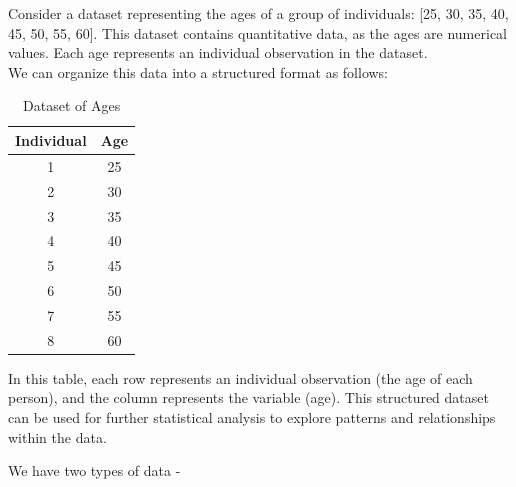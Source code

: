 \documentclass[openany]{book}
\begin{document}
\begin{example}
    Consider a dataset representing the ages of a group of individuals: [25, 30, 35, 40, 45, 50, 55, 60]. This dataset contains quantitative data, as the ages are numerical values. Each age represents an individual observation in the dataset. \\
    We can organize this data into a structured format as follows:
    \begin{table}[H]
        \centering
        \begin{tabular}{|c|c|}
            \hline
            \textbf{Individual} & \textbf{Age} \\
            \hline
            1 & 25 \\
            2 & 30 \\
            3 & 35 \\
            4 & 40 \\
            5 & 45 \\
            6 & 50 \\
            7 & 55 \\
            8 & 60 \\
            \hline
        \end{tabular}
        \caption{Dataset of Ages}
    \end{table}
    In this table, each row represents an individual observation (the age of each person), and the column represents the variable (age). This structured dataset can be used for further statistical analysis to explore patterns and relationships within the data.
\end{example}
We have two types of data - 
\end{document}
